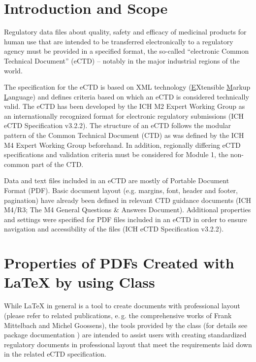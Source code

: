 \newcommand{\pkg}[1]{\textsf{#1}}
\newcommand{\prog}[1]{{#1}}
\newcommand{\env}[1]{\texttt{#1}}

\newcommand{\eg}{e.\,g.\xspace}
\makeatother



\section{Introduction and Scope}
Regulatory data files about quality, safety and efficacy of medicinal products for human use that are intended to be transferred electronically to a regulatory agency must be provided in a specified format, the so-called \enquote{electronic Common Technical Document} (eCTD) -- notably in the major industrial regions of the world.

The specification for the eCTD is based on XML technology (\underline{E}Xtensible \underline{M}arkup \underline{L}anguage) and defines criteria based on which an eCTD is considered technically valid. The eCTD has been developed by the ICH M2 Expert Working Group  as an internationally recognized format for electronic regulatory submissions (ICH eCTD Specification v3.2.2). The structure of an eCTD follows the modular pattern of the Common Technical Document (CTD) as was defined by the ICH M4 Expert Working Group beforehand. In addition, regionally differing eCTD specifications and validation criteria must be considered for Module 1, the non-common part of the CTD.

Data and text files included in an eCTD are mostly of Portable Document Format (PDF). Basic document layout (e.g. margins, font, header and footer, pagination) have already been defined in relevant CTD guidance documents (ICH M4/R3; The M4 General Questions \& Answers Document). Additional properties and settings were specified for PDF files included in an eCTD  in order to ensure navigation and accessibility of the files (ICH eCTD Specification v3.2.2).

\section{Properties of PDFs Created with \LaTeX{} by using Class \PharmRep}
While \LaTeX{} in general is a tool to create documents with professional layout (please refer to related publications, \eg the comprehensive works of Frank Mittelbach and Michel Goossens), the tools provided by the class \PharmRep (for details see package documentation ) are intended to assist users with creating standardized regulatory documents in professional layout that meet the requirements laid down in the related eCTD specification.

